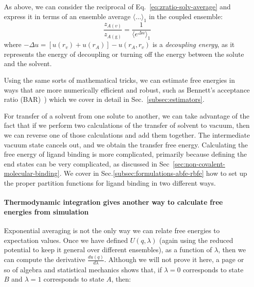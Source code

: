 \documentclass[9pt,bestpractices]{livecoms}
\begin{document}
As above, we can consider the reciprocal of Eq.~\ref{eq:zratio-solv-average} and express it in terms of an ensemble average $\langle \ldots \rangle_1$ in the coupled ensemble:
\begin{equation}
  \frac{z_{A(v)}}{z_{A(\mathrm{g})}} = \frac{1}{\langle e^{\Delta u} \rangle_1}
\end{equation}
where $-\Delta u = [ u(r_v) + u(r_A ) ] - u(r_A , r_v)$ is a \textit{decoupling energy}, as it represents the energy of decoupling or turning off the energy between the solute and the solvent.


Using the same sorts of mathematical tricks, we can estimate
free energies in ways that are more numerically efficient and robust, such as
Bennett's acceptance ratio
(BAR)~\cite{bennett1976efficient,shirts2003equilibrium}) which we
cover in detail in Sec.~\ref{subsec:estimators}.

For transfer of a solvent from one solute to another, we can take
advantage of the fact that if we perform two calculations of the
transfer of solvent to vacuum, then we can reverse one of those
calculations and add them together.  The intermediate vacuum state
cancels out, and we obtain the transfer free energy.  Calculating the
free energy of ligand binding is more complicated, primarily because defining the end states can be very complicated, as discussed in Sec~\ref{sec:non-covalent-molecular-binding}. We cover in Sec.\ref{subsec:formulations-abfe-rbfe} how to set up the proper partition functions for ligand binding in two different ways.


\paragraph{Thermodynamic integration gives another way to calculate free energies from simulation}

Exponential averaging is not the only way we can relate free energies to
expectation values.  Once we have defined $U(q,\lambda)$ (again using the reduced potential to keep it general over different ensembles), as
a function of $\lambda$, then we can compute the derivative
$\frac{du(q)}{d\lambda}$. Although we will not prove it here, a page or
so of algebra and statistical mechanics shows that, if $\lambda=0$
corresponds to state $B$ and $\lambda=1$ corresponds to state $A$,
then:
\end{document}

